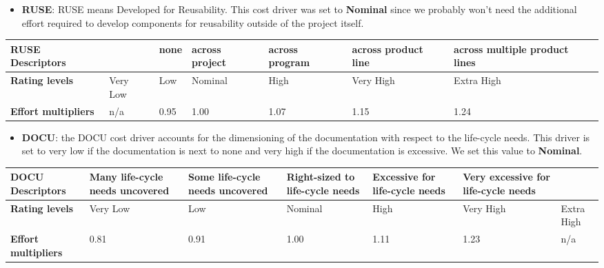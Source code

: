 		
		
		
		\begin{itemize}
			\item \textbf{RUSE}: RUSE means Developed for Reusability. This cost driver was set to \textbf{Nominal} since we probably won't need the additional effort required to develop components for reusability outside of the project itself.
		\end{itemize}
		
		\begin{center}
			\begin{tabular}{ | C{2cm} | C{2cm} | C{2cm} | C{2cm} | C{2cm} | C{2cm} | C{2cm} | }
				\hline
				\textbf{RUSE Descriptors} & & none & across project & across program & across product line & across multiple product lines\\ \hline
			
				\textbf{Rating levels} & Very Low & Low & Nominal & High & Very High & Extra High\\ \hline
			
				\textbf{Effort multipliers} & n/a & 0.95 & 1.00 & 1.07 & 1.15 & 1.24\\ \hline
			\end{tabular}
		\end{center}
		
		
		

		\begin{itemize}
			\item \textbf{DOCU}: the DOCU cost driver accounts for the dimensioning of the documentation with respect to the life-cycle needs. This driver is set to very low if the documentation is next to none and very high if the documentation is excessive. We set this value to \textbf{Nominal}.
		\end{itemize}
		
		\begin{center}
			\begin{tabular}{ | C{2cm} | C{2cm} | C{2cm} | C{2cm} | C{2cm} | C{2cm} | C{2cm} | }
				\hline
				\textbf{DOCU Descriptors} & Many life-cycle needs uncovered & Some life-cycle needs uncovered & Right-sized to life-cycle needs & Excessive for life-cycle needs & Very excessive for life-cycle needs & \\ \hline
			
				\textbf{Rating levels} & Very Low & Low & Nominal & High & Very High & Extra High\\ \hline
			
				\textbf{Effort multipliers} & 0.81 & 0.91 & 1.00 & 1.11 & 1.23 & n/a\\ \hline
			\end{tabular}
		\end{center}
		
